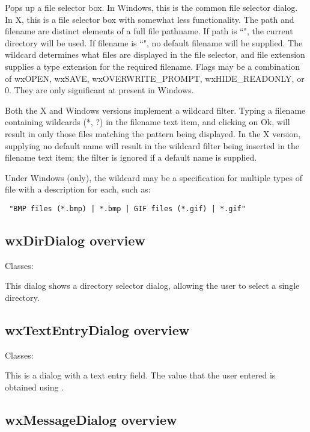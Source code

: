 Pops up a file selector box. In Windows, this is the common file selector
dialog. In X, this is a file selector box with somewhat less functionality.
The path and filename are distinct elements of a full file pathname.
If path is ``", the current directory will be used. If filename is ``",
no default filename will be supplied. The wildcard determines what files
are displayed in the file selector, and file extension supplies a type
extension for the required filename. Flags may be a combination of wxOPEN,
wxSAVE, wxOVERWRITE\_PROMPT, wxHIDE\_READONLY, or 0. They are only significant
at present in Windows.

Both the X and Windows versions implement a wildcard filter. Typing a
filename containing wildcards (*, ?) in the filename text item, and
clicking on Ok, will result in only those files matching the pattern being
displayed. In the X version, supplying no default name will result in the
wildcard filter being inserted in the filename text item; the filter is
ignored if a default name is supplied.

Under Windows (only), the wildcard may be a specification for multiple
types of file with a description for each, such as:

\begin{verbatim}
 "BMP files (*.bmp) | *.bmp | GIF files (*.gif) | *.gif"
\end{verbatim}

\subsection{wxDirDialog overview}\label{wxdirdialogoverview}

Classes: 

This dialog shows a directory selector dialog, allowing the user to select a single
directory.

\subsection{wxTextEntryDialog overview}\label{wxtextentrydialogoverview}

Classes: 

This is a dialog with a text entry field. The value that the user
entered is obtained using .

\subsection{wxMessageDialog overview}\label{wxmessagedialogoverview}

